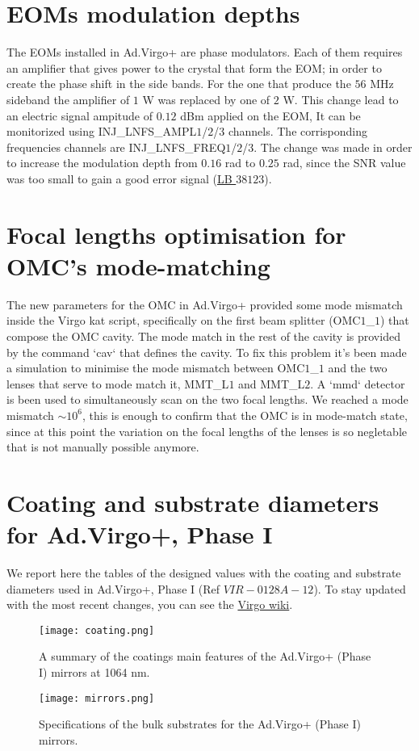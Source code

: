 \documentclass[color,DIV12,pdftex,a4paper]{virgo-note}
\begin{document}
\section{EOMs modulation depths }\label{sec:EOM modulation lengths}

The EOMs installed in Ad.Virgo+ are phase modulators. Each of them requires an amplifier that gives power to the crystal that form the EOM; in order to create the phase shift in the side bands.
For the one that produce the $56$ MHz sideband the amplifier of $1$ W was replaced by one of $2$ W. This change lead to an electric signal ampitude of $0.12$ dBm applied on the EOM, It can be monitorized using INJ\_LNFS\_AMPL$1$/$2$/$3$ channels. The corrisponding frequencies channels are INJ\_LNFS\_FREQ$1$/$2$/$3$.  The change was made in
order to increase the modulation depth from $0.16$ rad to $0.25$ rad, since the SNR value was too small to gain a good error signal (\href{https://logbook.virgo-gw.eu/virgo/?c=}{LB $38123$}).

\section{Focal lengths optimisation for OMC's  mode-matching }\label{sec: mode-match}
The new parameters for the OMC in Ad.Virgo+ provided some mode mismatch inside the Virgo kat script, specifically on the first beam splitter (OMC$1$\_$1$) that compose the OMC cavity. The mode match in the rest of the cavity is provided by the command `cav` that defines the cavity. To fix this problem it's been made a simulation to minimise the mode mismatch between OMC$1$\_$1$ and the two lenses that serve to mode match it, MMT\_L$1$ and MMT\_L$2$. A `mmd` detector is been used to simultaneously scan on the two focal lengths. We reached a mode mismatch $\sim 10^6$, this is enough to confirm that the OMC is in mode-match state, since at this point the variation on the focal lengths of the lenses is so negletable that is not manually possible anymore.

\newpage
\section{Coating and substrate diameters for Ad.Virgo+, Phase I}
We report here the tables of the designed values with the coating and substrate diameters used in Ad.Virgo+, Phase I (Ref \href{https://tds.virgo-gw.eu/?content=3&r=9317}{$VIR-0128A-12$}). To stay updated with the most recent changes, you can see the \href{https://wiki.virgo-gw.eu/Commissioning/OptChar/Param_sim}{Virgo wiki}.
\begin{figure}[h!]
  \centering
  \texttt{[image: coating.png]}
  \caption{A summary of the coatings main features of the Ad.Virgo+ (Phase I) mirrors at 1064 nm.}
  \label{fig:coat}
\end{figure}
\begin{figure}[h!]
  \centering
  \texttt{[image: mirrors.png]}
  \caption{Specifications of the bulk substrates for the Ad.Virgo+ (Phase I) mirrors.}
  \label{fig:coat}
\end{figure}
\end{document}
